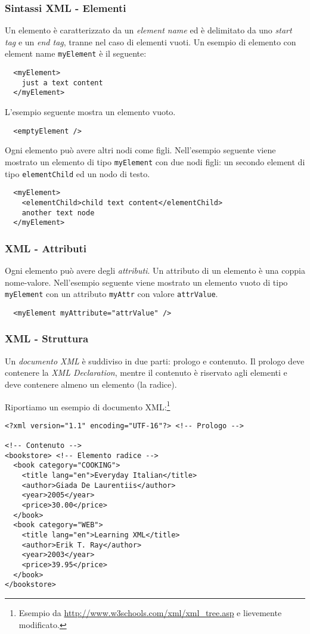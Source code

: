 \documentclass[8pt]{beamer}
\begin{document}
\begin{frame}[fragile]
 \frametitle{Sintassi XML - Elementi}

 
 Un elemento \`e caratterizzato da un \emph{element name}
 ed \`e delimitato da uno \emph{start tag} e un \emph{end tag},
 tranne nel caso di elementi vuoti.
 Un esempio di elemento con element name \texttt{myElement} \`e
 il seguente:
\begin{verbatim}
  <myElement>
    just a text content
  </myElement>
\end{verbatim}

 L'esempio seguente mostra un elemento vuoto.
\begin{verbatim}
  <emptyElement />
\end{verbatim}
  
 Ogni elemento pu\`o avere altri nodi come figli.
 Nell'esempio seguente viene mostrato un elemento 
 di tipo \texttt{myElement} con due nodi figli:
 un secondo element di tipo \texttt{elementChild}
 ed un nodo di testo.
\begin{verbatim}
  <myElement>
    <elementChild>child text content</elementChild>
    another text node
  </myElement>
\end{verbatim}
\end{frame}

\begin{frame}[fragile]
 \frametitle{XML - Attributi}
 Ogni elemento pu\`o avere degli \emph{attributi}.
 Un attributo di un elemento \`e una coppia nome-valore. 
 Nell'esempio seguente viene mostrato un elemento vuoto 
 di tipo \texttt{myElement} con un attributo \texttt{myAttr} 
 con valore \texttt{attrValue}.
\begin{verbatim}
  <myElement myAttribute="attrValue" />
\end{verbatim}
\end{frame}

\begin{frame}[fragile]
 \frametitle{XML - Struttura}
 Un \emph{documento XML} \`e suddiviso in due parti: prologo e 
 contenuto. Il prologo deve contenere la \emph{XML Declaration},
 mentre il contenuto \`e riservato agli elementi e deve contenere
 almeno un elemento (la radice).
 \vspace{\baselineskip}

 Riportiamo un esempio di documento XML:\footnote{Esempio da \url{http://www.w3schools.com/xml/xml_tree.asp} e lievemente modificato.}
\begin{small}
\begin{verbatim}
<?xml version="1.1" encoding="UTF-16"?> <!-- Prologo -->

<!-- Contenuto -->
<bookstore> <!-- Elemento radice -->
  <book category="COOKING">
    <title lang="en">Everyday Italian</title>
    <author>Giada De Laurentiis</author>
    <year>2005</year>
    <price>30.00</price>
  </book>
  <book category="WEB">
    <title lang="en">Learning XML</title>
    <author>Erik T. Ray</author>
    <year>2003</year>
    <price>39.95</price>
  </book>
</bookstore> 
\end{verbatim}
\end{small}
\end{frame}
\end{document}
